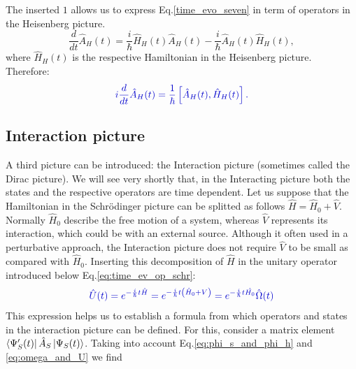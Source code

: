 \documentclass[12pt, titlepage]{article}
\begin{document}
The inserted $ 1 $ allows us to express Eq.\enskip\eqref{time_evo_seven} in term of operators in the Heisenberg picture.
\begin{equation}
\frac{d}{dt}\hat{A}_{H}(t)
	=\frac{i}{\hbar}
	\hat{H}_{H}(t)\hat{A}_{H}(t)
	-
	\frac{i}{\hbar}
	\hat{A}_{H}(t)\hat{H}_{H}(t),
\end{equation} 
where $ \hat{H}_{H}(t) $ is the respective Hamiltonian in the Heisenberg  picture.
Therefore:
\begin{equation}\label{eq:Heisenberg_time_dep._eq.}
\textcolor[RGB]{0,0,204}{
i\frac{d}{d t}\hat{A}_{H}(t)=
\frac{1}{\hbar}\left[ \hat{A}_{H}(t),\hat{H}_{H}(t)\right] 
.
}
\end{equation} 
\subsection{Interaction picture}\label{Interactionpicture}
A third picture can be introduced: the Interaction picture (sometimes called the Dirac picture). We will see very shortly that, in the Interacting picture both the states and the respective operators are time dependent.
Let us suppose that the Hamiltonian in the Schrödinger picture can be splitted as follows $ \hat{H} = \hat{H}_{0}+\hat{V} $. Normally $ \hat{H}_{0} $ describe the free motion of a system, whereas  $ \hat{V} $ represents its interaction, which could be with an external source. Although it often used in a perturbative approach, the Interaction picture does not require $ \hat{V} $  to be small as compared with $ \hat{H}_{0} $. 
Inserting this decomposition of $ \hat{H} $ in the unitary operator introduced below Eq.\enskip\eqref{eq:time_ev_op_schr}:
\begin{equation}\label{eq:omega_and_U}
\textcolor[RGB]{0,0,204}{
\hat{U}(t)=e^{-\frac{i}{\hbar}t \hat{H}}
=e^{-\frac{i}{\hbar}t\left(  \hat{H}_{0}+V\right) }
=
e^{-\frac{i}{\hbar}t \hat{H_{0}}}
\hat{\Omega} (t)
}
\end{equation}
This expression helps us to establish a formula from which operators and states in the interaction picture can be defined. For this, consider a matrix element $ 	\bra{\Psi_{S}^{\prime}(t)}
	\hat{A}_{S}
	\ket{\Psi_{S}(t)} $. Taking into account Eq.\enskip\eqref{eq:phi_s_and_phi_h} and \eqref{eq:omega_and_U} we find
\end{document}
